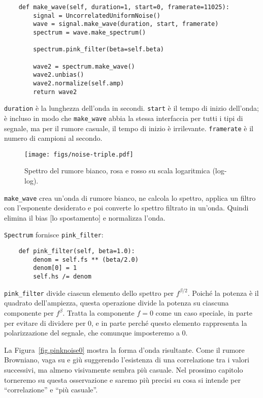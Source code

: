\documentclass[12pt]{book} \usepackage[width=5.5in,height=8.5in, hmarginratio=3:2,vmarginratio=1:1]{geometry}
\begin{document}
\begin{verbatim} 
    def make_wave(self, duration=1, start=0, framerate=11025):
        signal = UncorrelatedUniformNoise()
        wave = signal.make_wave(duration, start, framerate)
        spectrum = wave.make_spectrum()

        spectrum.pink_filter(beta=self.beta)

        wave2 = spectrum.make_wave()
        wave2.unbias()
        wave2.normalize(self.amp)
        return wave2
 \end{verbatim} 

{\tt duration} è la lunghezza dell'onda in secondi. {\tt start} è il tempo di inizio dell'onda; è incluso in modo che \verb"make_wave" abbia la stessa interfaccia per tutti i tipi di segnale, ma per il rumore casuale, il tempo di inizio è irrilevante. {\tt framerate} è il numero di campioni al secondo.

\begin{figure} 

\centerline{\texttt{[image: figs/noise-triple.pdf]}} \caption{Spettro del rumore bianco, rosa e rosso su scala logaritmica (log-log).} \label{fig.noise-triple} \end{figure} 

\verb"make_wave" crea un'onda di rumore bianco, ne calcola lo spettro, applica un filtro con l'esponente desiderato e poi converte lo spettro filtrato in un'onda. Quindi elimina il bias [lo spostamento] e normalizza l'onda.

{\tt Spectrum} fornisce \verb"pink_filter":

\begin{verbatim} 
    def pink_filter(self, beta=1.0):
        denom = self.fs ** (beta/2.0)
        denom[0] = 1
        self.hs /= denom
 \end{verbatim} 

\verb"pink_filter" divide ciascun elemento dello spettro per $f^{\beta/2}$. Poiché la potenza è il quadrato dell'ampiezza, questa operazione divide la potenza su ciascuna componente per $f^\beta$. Tratta la componente $f=0$ come un caso speciale, in parte per evitare di dividere per 0, e in parte perché questo elemento rappresenta la polarizzazione del segnale, che comunque imposteremo a 0.

La Figura~\ref{fig.pinknoise0} mostra la forma d'onda risultante. Come il rumore Browniano, vaga su e giù suggerendo l'esistenza di una correlazione tra i valori successivi, ma almeno visivamente sembra più casuale. Nel prossimo capitolo torneremo su questa osservazione e saremo più precisi su cosa si intende per ``correlazione'' e ``più casuale''.
\end{document}
